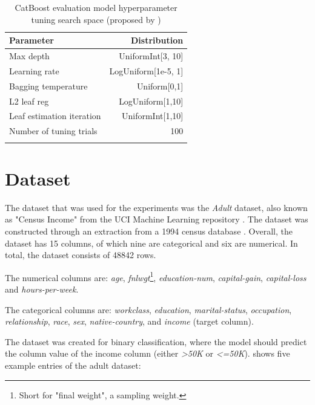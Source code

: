 \begin{table}[H]
	\centering
	\begin{tabular}{lr}
		\toprule
		Parameter                 & Distribution        \\
		\midrule
		Max depth                 & UniformInt[3, 10]   \\
		Learning rate             & LogUniform[1e-5, 1] \\
		Bagging temperature       & Uniform[0,1]        \\
		L2 leaf reg               & LogUniform[1,10]    \\
		Leaf estimation iteration & UniformInt[1,10]    \\
		\midrule
		Number of tuning trials   & 100                 \\
		\bottomrule
		\multicolumn{2}{c}{}\\[-0.6em]
	\end{tabular}
	\caption[CatBoost Hyperparameter Search Space]{CatBoost evaluation model hyperparameter tuning search space (proposed by \cite{gorishniy2021RevisitingDeepLearning})}
	\label{tab:catboost_tune}
\end{table}

\section{Dataset}
\label{ch:methods-datasets}

The dataset that was used for the experiments was the \textit{Adult} dataset, also known as "Census Income" from the UCI Machine Learning repository \cite{Dua:2019}.
The dataset was constructed through an extraction from a 1994 census database \cite{kohavi1996ScalingAccuracyNaiveBayes}.
Overall, the dataset has 15 columns, of which nine are categorical and six are numerical.
In total, the dataset consists of 48842 rows.\newline

The numerical columns are: \textit{age}, \textit{fnlwgt}\footnote{Short for "final weight", a sampling weight.}, \textit{education-num}, \textit{capital-gain}, \textit{capital-loss} and \textit{hours-per-week}.

The categorical columns are: \textit{workclass}, \textit{education}, \textit{marital-status}, \textit{occupation}, \textit{relationship}, \textit{race}, \textit{sex}, \textit{native-country}, and \textit{income} (target column). \newline


The dataset was created for binary classification, where the model should predict the column value of the income column (either \textit{>50K} or \textit{<=50K}).
 shows five example entries of the adult dataset:

